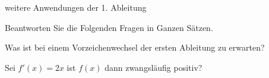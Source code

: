 \documentclass[
    ngerman,
    color=1b,
    load_common,
    leqno,
    boxarc,
    solution=true,
]{rubos-tuda-template}
\begin{document}
\begin{task}[points=2]{weitere Anwendungen der 1. Ableitung}
    \begin{grayInfoBox}
        Beantworten Sie die Folgenden Fragen in Ganzen Sätzen.
    \end{grayInfoBox}
    \begin{cpenumerate}[label=\alph*)]
        \item Was ist bei einem Vorzeichenwechsel der ersten Ableitung zu erwarten?
        \item Sei $f'(x)=2x$ ist $f(x)$ dann zwangsläufig positiv?
    \end{cpenumerate}\mbox{}\\
    \mbox{}
    \dotfill\\[2em]
    \mbox{}
    \dotfill\\[2em]
    \mbox{}\dotfill\\[2em]
    \mbox{}\dotfill
\end{task}
\clearpage
\end{document}
